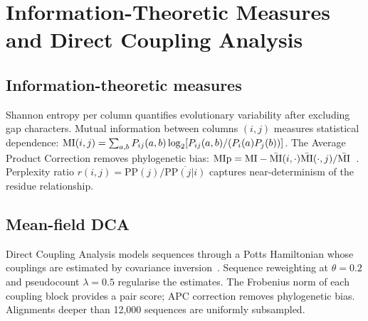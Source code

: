 \section{Information-Theoretic Measures and Direct Coupling Analysis}
\label{sec:theory-info-dca}

\subsection{Information-theoretic measures}
Shannon entropy per column quantifies evolutionary variability after excluding
gap characters.  Mutual information between columns $(i,j)$ measures
statistical dependence:
$\mathrm{MI}(i,j) = \sum_{a,b} P_{ij}(a,b) \log_2[P_{ij}(a,b)/(P_i(a)P_j(b))]$.
The Average Product Correction removes phylogenetic bias:
$\mathrm{MIp} = \mathrm{MI} - \bar{\mathrm{MI}}(i,\cdot)\bar{\mathrm{MI}}(\cdot,j)/\bar{\mathrm{MI}}$~\cite{dunn2008}.
Perplexity ratio $r(i,j) = \mathrm{PP}(j)/\overline{\mathrm{PP}(j|i)}$
captures near-determinism of the residue relationship.

\subsection{Mean-field DCA}
Direct Coupling Analysis models sequences through a Potts Hamiltonian whose
couplings are estimated by covariance inversion~\cite{weigt2009,morcos2011}.
Sequence reweighting at $\theta=0.2$ and pseudocount $\lambda=0.5$ regularise
the estimates.  The Frobenius norm of each coupling block provides a pair
score; APC correction removes phylogenetic bias.  Alignments deeper than
12{,}000 sequences are uniformly subsampled.
